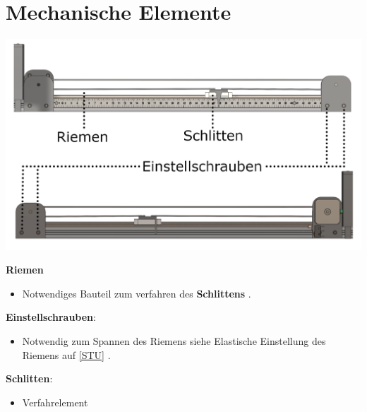 %
%

\chapter{Mechanische Elemente}
\begin{center}
	
	\includegraphics[width=\textwidth]{Images/Konstruktion4.png}
\end{center}
	\textbf{Riemen}
\begin{itemize}
	\item Notwendiges Bauteil zum verfahren des \textbf{Schlittens} .
\end{itemize}
\textbf{Einstellschrauben}: 
\begin{itemize}
	\item Notwendig zum Spannen des Riemens siehe \glqq Elastische Einstellung des Riemens \grqq auf \ref{STU} . 
\end{itemize}
\textbf{Schlitten}: 
\begin{itemize}
	\item Verfahrelement  
\end{itemize}



